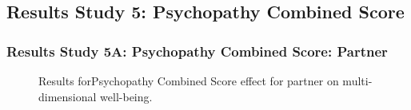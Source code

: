 \documentclass[
  singlecolumn]{article}
\begin{document}
\newpage{}

\subsection{Results Study 5: Psychopathy Combined
Score}\label{results-study-5-psychopathy-combined-score}

\subsubsection{Results Study 5A: Psychopathy Combined Score:
Partner}\label{results-study-5a-psychopathy-combined-score-partner}

\begin{figure}


\caption{\label{fig-results-psychopathy-partner}Results forPsychopathy
Combined Score effect for partner on multi-dimensional well-being.}

\end{figure}%

\newpage{}
\end{document}

